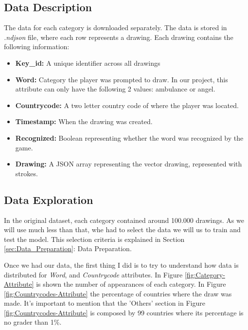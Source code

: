 \documentclass{article}
\begin{document}
\subsection{Data Description}
\label{sec:Data_Description}
The data for each category is downloaded separately. The data is stored in \textit{.ndjson} file, where each row represents a drawing. Each drawing contains the following information:
\begin{itemize}
    \setlength\itemsep{0.05em}
    \item \textbf{Key\_id:} A unique identifier across all drawings
    \item \textbf{Word:} Category the player was prompted to draw. In our project, this attribute can only have the following 2 values: ambulance or angel.
    \item \textbf{Countrycode:} A two letter country code of where the player was located.
    \item \textbf{Timestamp:} When the drawing was created.
    \item \textbf{Recognized:} Boolean representing whether the word was recognized by the game.
    \item \textbf{Drawing:}  A JSON array representing the vector drawing, represented with strokes.
\end{itemize}

\subsection{Data Exploration}
In the original dataset, each category contained around 100.000 drawings. As we will use much less than that, whe had to select the data we will us to train and test the model. This selection criteria is explained in Section \ref{sec:Data_Preparation}: Data Preparation.

Once we had our data, the first thing I did is to try to understand how data is distributed for \textit{Word}, and \textit{Countrycode} attributes. In Figure \ref{fig:Category-Attribute} is shown the number of appearances of each category. In Figure \ref{fig:Countrycodes-Attribute} the percentage of countries where the draw was made. It's important to mention that the 'Others' section in Figure \ref{fig:Countrycodes-Attribute} is composed by 99 countries where its percentage is no grader than 1\%.
\end{document}
